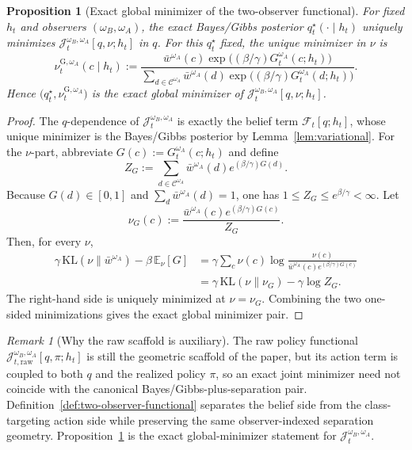 \documentclass[11pt]{article}
\newtheorem{proposition}[theorem]{Proposition}
\theoremstyle{definition}
\theoremstyle{remark}
\newtheorem{remark}[theorem]{Remark}
\newcommand{\Ccal}{\mathcal{C}}
\newcommand{\E}{\mathbb{E}}
\newcommand{\KL}{\mathrm{KL}}
\begin{document}
\begin{proposition}[Exact global minimizer of the two-observer functional]
\label{prop:two-observer-minimizer}
For fixed $h_t$ and observers $(\omega_B,\omega_A)$, the exact Bayes/Gibbs posterior $q_t^\star(\cdot\mid h_t)$ uniquely minimizes $\mathcal J_t^{\omega_B,\omega_A}[q,\nu;h_t]$ in $q$. For this $q_t^\star$ fixed, the unique minimizer in $\nu$ is
\[
\nu_t^{\mathrm G,\omega_A}(c\mid h_t)
:=
\frac{\bar w^{\omega_A}(c)\exp\!\bigl((\beta/\gamma)G_t^{\omega_A}(c;h_t)\bigr)}
{\sum_{d\in\Ccal^{\omega_A}}\bar w^{\omega_A}(d)\exp\!\bigl((\beta/\gamma)G_t^{\omega_A}(d;h_t)\bigr)}.
\]
Hence $\bigl(q_t^\star,\nu_t^{\mathrm G,\omega_A}\bigr)$ is the exact global minimizer of $\mathcal J_t^{\omega_B,\omega_A}[q,\nu;h_t]$.
\end{proposition}

\begin{proof}
The $q$-dependence of $\mathcal J_t^{\omega_B,\omega_A}$ is exactly the belief term $\mathcal F_t[q;h_t]$, whose unique minimizer is the Bayes/Gibbs posterior by Lemma~\ref{lem:variational}. For the $\nu$-part, abbreviate $G(c):=G_t^{\omega_A}(c;h_t)$ and define
\[
Z_G:=\sum_{d\in\Ccal^{\omega_A}}\bar w^{\omega_A}(d)e^{(\beta/\gamma)G(d)}.
\]
Because $G(d)\in[0,1]$ and $\sum_d\bar w^{\omega_A}(d)=1$, one has $1\le Z_G\le e^{\beta/\gamma}<\infty$. Let
\[
\nu_G(c):=\frac{\bar w^{\omega_A}(c)e^{(\beta/\gamma)G(c)}}{Z_G}.
\]
Then, for every $\nu$,
\begin{align*}
\gamma\,\KL(\nu\|\bar w^{\omega_A})-\beta\,\E_\nu[G]
&=\gamma\sum_c \nu(c)\log\frac{\nu(c)}{\bar w^{\omega_A}(c)e^{(\beta/\gamma)G(c)}}\\
&=\gamma\,\KL(\nu\|\nu_G)-\gamma\log Z_G.
\end{align*}
The right-hand side is uniquely minimized at $\nu=\nu_G$. Combining the two one-sided minimizations gives the exact global minimizer pair.
\end{proof}

\begin{remark}[Why the raw scaffold is auxiliary]
\label{rem:raw-scaffold-auxiliary}
The raw policy functional $\mathcal J_{t,\mathrm{raw}}^{\omega_B,\omega_A}[q,\pi;h_t]$ is still the geometric scaffold of the paper, but its action term is coupled to both $q$ and the realized policy $\pi$, so an exact joint minimizer need not coincide with the canonical Bayes/Gibbs-plus-separation pair. Definition~\ref{def:two-observer-functional} separates the belief side from the class-targeting action side while preserving the same observer-indexed separation geometry. Proposition~\ref{prop:two-observer-minimizer} is the exact global-minimizer statement for $\mathcal J_t^{\omega_B,\omega_A}$.
\end{remark}
\end{document}
